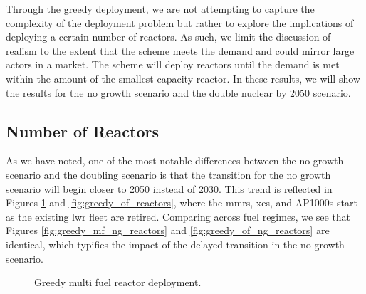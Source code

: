 Through the greedy deployment, we are not attempting to capture the complexity
of the deployment problem but rather to explore the implications of deploying a
certain number of reactors. As such, we limit the discussion of realism to the
extent that the scheme meets the demand and could mirror large actors in a
market. The scheme will deploy reactors until the demand is met within the
amount of the smallest capacity reactor. In these results, we will show the results for the no growth scenario and the double nuclear by 2050 scenario.

\subsection{Number of Reactors}
\label{sec:greedy_reactors}

As we have noted, one of the most notable differences between the no growth scenario and the doubling scenario is that the transition for the no growth scenario will begin closer to 2050 instead of 2030. This trend is reflected in Figures \ref{fig:greedy_mf_reactors} and \ref{fig:greedy_of_reactors}, where the \glspl{mmr}, \glspl{xe}, and AP1000s start as the existing \gls{lwr} fleet are retired. Comparing across fuel regimes, we see that Figures \ref{fig:greedy_mf_ng_reactors} and \ref{fig:greedy_of_ng_reactors} are identical, which typifies the impact of the delayed transition in the no growth scenario.


\begin{figure}[H]
    \hfill
    \caption{Greedy multi fuel reactor deployment.}
    \label{fig:greedy_mf_reactors}
\end{figure}


